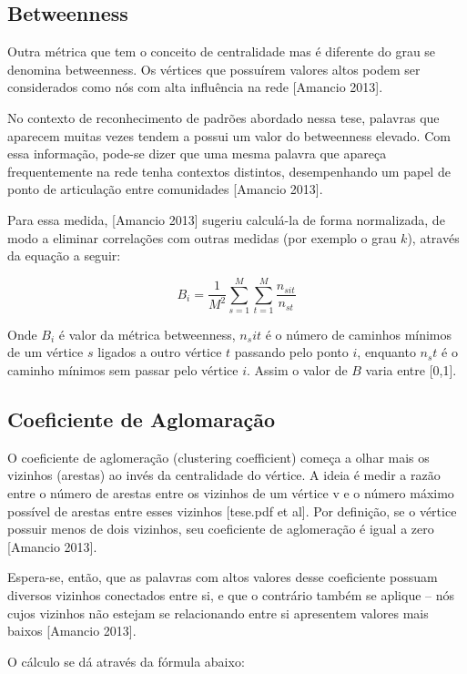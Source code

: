 \documentclass[xindy,rascunho]{fei}
\begin{document}
\subsection{Betweenness}
Outra métrica que tem o conceito de centralidade mas é diferente do grau se denomina betweenness. Os vértices que possuírem valores altos podem ser considerados como nós com alta influência na rede [Amancio 2013]. 

No contexto de reconhecimento de padrões abordado nessa tese,  palavras que aparecem muitas vezes tendem a possui um valor do betweenness elevado. Com essa informação, pode-se dizer que uma mesma palavra que apareça frequentemente na rede tenha contextos distintos, desempenhando um papel de ponto de articulação entre comunidades [Amancio 2013].

Para essa medida, [Amancio 2013] sugeriu calculá-la de forma normalizada, de modo a eliminar correlações com outras medidas (por exemplo o grau $k$), através da equação a seguir:

\begin{equation} \label{eq:Betweenness}
B_i = \frac{1}{M^2} \sum_{s=1}^{M}\sum_{t=1}^{M}\frac{n_{sit}}{n_{st}}
\end{equation}

Onde $B_i$ é valor da métrica betweenness, $n_sit$ é o número de caminhos mínimos de um vértice $s$ ligados a outro vértice $t$ passando pelo ponto $i$, enquanto $n_st$ é o caminho mínimos sem passar pelo vértice $i$. Assim o valor de $B$ varia entre [0,1].

\subsection{Coeficiente de Aglomaração}
O coeficiente de aglomeração (clustering coefficient) começa a olhar mais os vizinhos (arestas) ao invés da centralidade do vértice. A ideia é medir a razão entre o número de arestas entre os vizinhos de um vértice v e o número máximo possível de arestas entre esses vizinhos [tese.pdf et al]. Por definição, se o vértice possuir menos de dois vizinhos, seu coeficiente de aglomeração é igual a zero [Amancio 2013].

Espera-se, então, que as palavras com altos valores desse coeficiente possuam diversos vizinhos conectados entre si, e que o contrário também se aplique – nós cujos vizinhos não estejam se relacionando entre si apresentem valores mais baixos [Amancio 2013].

O cálculo se dá através da fórmula abaixo:
\end{document}
